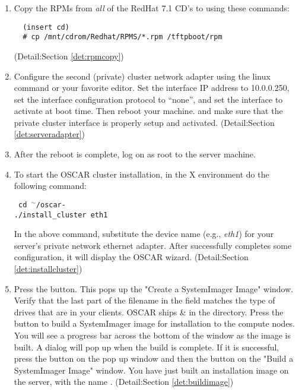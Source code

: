 \begin {enumerate}
Ignore the configure script, it is not used in the installation process
of OSCAR.

(Detail:Section \ref{det:unpack})

\item Copy the RPMs from \emph{all} of the RedHat 7.1 CD's to 
using these commands:

\begin{verbatim}
  (insert cd)
  # cp /mnt/cdrom/Redhat/RPMS/*.rpm /tftpboot/rpm
\end{verbatim}
(Detail:Section \ref{det:rpmcopy})

\item Configure the second (private) cluster network adapter using the linux
 command or your favorite editor. Set the interface 
IP address to 10.0.0.250, set the interface configuration protocol
to ``none'', and set the interface to activate at boot time.
Then reboot your machine. and make sure that the private cluster
interface is properly setup and activated. 
(Detail:Section \ref{det:serveradapter})

\item After the reboot is complete, log on as root to the server 
machine.

\item To start the OSCAR cluster installation,  in the X environment do
the following command:

\vspace{11pt}
{\tt
  cd $^\sim$/oscar-\oscarversion \\
  ./install\_cluster eth1
}
\vspace{11pt}
  
In the above command, substitute the device name 
(e.g., \emph{eth1})
for your server's private network ethernet adapter. After 
successfully completes some configuration, it will display 
the OSCAR wizard.
(Detail:Section \ref{det:installcluster})

\item Press the  button. 
This pops up the "Create a SystemImager Image" window. Verify that the last
part of the filename in the  field matches
the type of drives that are in your clients. OSCAR ships 
\&  in the  directory.
Press the  button to build a SystemImager image for installation to
the compute nodes.  You will see a progress bar across the bottom
of the window as the image is built.  A dialog will pop up when the build is complete. 
If it is successful, press the  button on the pop up window 
and then the  button on the "Build a SystemImager
Image" window. You have just built an installation image on the
server, with the name .
(Detail:Section \ref{det:buildimage})


\end{enumerate}
